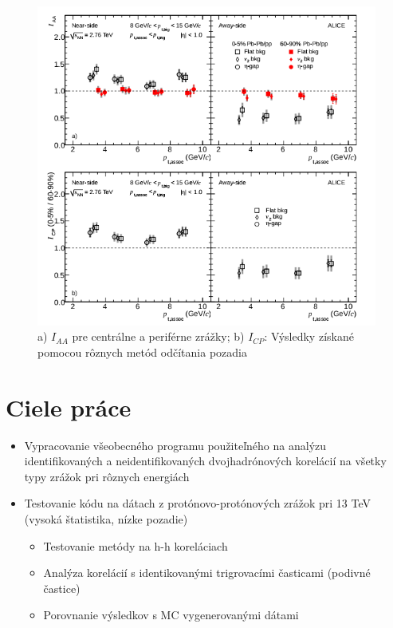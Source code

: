 \documentclass[thesismargins, thesislinespacing]{rnthesis}
\begin{document}
\begin{figure}[hbtp!]
	\centering
	\includegraphics[scale=1]{./Obrazky_praca/clanok2.png}
	\caption{ a) $I_{AA}$ pre centrálne a periférne zrážky; b) $I_{CP}$: Výsledky získané pomocou rôznych metód odčítania pozadia~\cite{clanok}}
	\label{clanok2}
\end{figure}



\chapter{Ciele práce} 
\begin{itemize}
	\item Vypracovanie všeobecného programu použiteľného na analýzu identifikovaných a neidentifikovaných dvojhadrónových korelácií na všetky typy zrážok pri rôznych energiách
	\item Testovanie kódu na dátach z protónovo-protónových zrážok pri 13 TeV (vysoká štatistika, nízke pozadie)
	\begin{itemize}
		\item Testovanie metódy na h-h koreláciach
		\item Analýza korelácií s identikovanými trigrovacími časticami (podivné častice)
		\item Porovnanie výsledkov s MC vygenerovanými dátami 
	\end{itemize}
\end{itemize}
\end{document}
